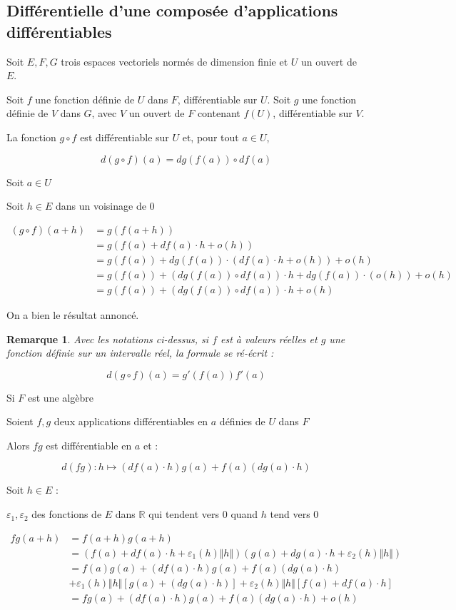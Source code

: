 \documentclass[a4paper,12pt]{book}
\newcommand{\Prop}[2]{\begin{tcolorbox}[sharp corners, colback=white,colframe=red!90!black!75, title=Proposition : #1]#2\end{tcolorbox}}
\newcommand{\Pre}[1]{\begin{tcolorbox}[sharp corners, colback=white,colframe=green!60!green!30!black!75, title=Preuve]#1\end{tcolorbox}}
\newtheorem{Rem}{Remarque}[section]
\def\R{\mathbb{R}}
\begin{document}
\subsection{Différentielle d'une composée d'applications différentiables}
\Prop{}{Soit $E,F, G$ trois espaces vectoriels normés de dimension finie et $U$ un ouvert de $E$.
\par Soit $f$ une fonction définie de $U$ dans $F$, différentiable sur $U$. Soit $g$ une fonction définie de $V$ dans $G$, avec $V$ un ouvert de $F$ contenant $f(U)$, différentiable sur $V$.
\par La fonction $g\circ f$ est différentiable sur $U$ et, pour tout $a\in U$,
\par $$d(g\circ f)(a) = dg(f(a))\circ df(a)$$}
\Pre{Soit $a\in U$
\par Soit $h\in E$ dans un voisinage de $0$
\par \begin{align*}(g\circ f)(a+h) &= g(f(a+h))\\
&=g(f(a)+df(a)\cdot h+o(h))\\
&=g(f(a))+dg(f(a))\cdot (df(a)\cdot h+o(h))+o(h)\\
&=g(f(a))+(dg(f(a))\circ df(a))\cdot h+ dg(f(a))\cdot (o(h)) +o(h)\\
&=g(f(a))+(dg(f(a))\circ df(a))\cdot h+o(h)\end{align*}
\par On a bien le résultat annoncé.}
\begin{Rem}
Avec les notations ci-dessus, si $f$ est à valeurs réelles et $g$ une fonction définie sur un intervalle réel, la formule se ré-écrit :
\par $$d(g\circ f)(a) =g'(f(a))f'(a)$$
\end{Rem}
\Prop{Cas d'une algèbre}{Si $F$ est une algèbre
\par Soient $f,g$ deux applications différentiables en $a$ définies de $U$ dans $F$
\par Alors $fg$ est différentiable en $a$ et :
\par $$d(fg):h\mapsto (df(a)\cdot h)g(a) + f(a)(dg(a)\cdot h)$$}
\Pre{Soit $h\in E$ :
\par $\varepsilon_1,\varepsilon_2$ des fonctions de $E$ dans $\R$ qui tendent vers $0$ quand $h$ tend vers $0$
\par \begin{align*} fg(a+h)&=f(a+h)g(a+h)\\
&=(f(a)+df(a)\cdot h+\varepsilon_1(h)\Vert h\Vert)(g(a)+dg(a)\cdot h+\varepsilon_2(h)\Vert h\Vert)\\
&= f(a)g(a) +(df(a)\cdot h)g(a) + f(a)(dg(a)\cdot h)\\
&+ \varepsilon_1(h)\Vert h\Vert[g(a) + (dg(a)\cdot h)]+\varepsilon_2(h)\Vert h\Vert[f(a)+df(a)\cdot h]\\
&=fg(a) + (df(a)\cdot h)g(a)+f(a)(dg(a)\cdot h)+o(h)\end{align*}}
\end{document}
